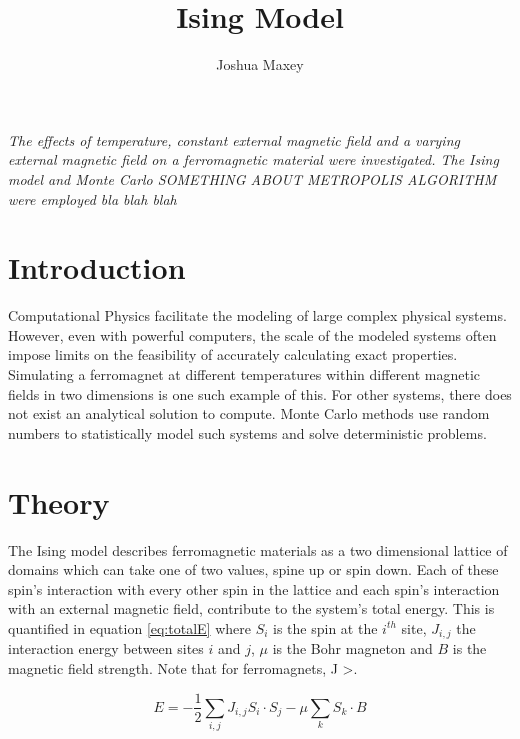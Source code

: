 \documentclass[11pt]{article}   	%
\title{Ising Model}
\author{Joshua Maxey}
\begin{document}
\maketitle
\begin{centering}
\begin{comment}
FOUR PROPS (E, M, SHC AND MS) WERE RECORDED FOR AT THE END OF MULTIPLE AVERAGED SIMULATIONS VARYING BETA (TEMP ANALOGUE) FOR ZERO AND CONSTANT NON ZERO B FIELD BEFOREMOVING OTO FIXING BETA AND VARYING THE MAGNETIC FIELD IN BOTH DIRECTIONS IE INC AND DEC B FIELD
\end{comment}
\it{The effects of temperature, constant external magnetic field and a varying external magnetic field on a ferromagnetic material were investigated. The Ising model and Monte Carlo SOMETHING ABOUT METROPOLIS ALGORITHM were employed bla blah blah}
\end{centering}
\section{Introduction}
Computational Physics facilitate the modeling of large complex physical systems. However, even with powerful computers, the scale of the modeled systems often impose limits on the feasibility of accurately calculating exact properties. Simulating a ferromagnet at different temperatures within different magnetic fields in two dimensions is one such example of this. For other systems, there does not exist an analytical solution to compute. Monte Carlo methods use random numbers to statistically model such systems and solve deterministic problems.

\section{Theory}
The Ising model describes ferromagnetic materials as a two dimensional lattice of domains which can take one of two values, spine up or spin down. Each of these spin's interaction with every other spin in the lattice and each spin's interaction with an external magnetic field, contribute to the system's total energy. This is quantified in equation \ref{eq:totalE} where \textbf{$S_i$} is the spin at the $i^{th}$ site, $J_{i,j}$ the interaction energy between sites $i$ and $j$, $\mu$ is the Bohr magneton and $B$ is the magnetic field strength. Note that for ferromagnets, J \textgreater {}.

\begin{equation} \label{eq:totalE}
E = -\frac{1}{2}\sum\limits_{i,j}J_{i,j}S_i \cdot S_j - \mu \sum\limits_{k}S_k \cdot B
\end{equation}
\end{document}
